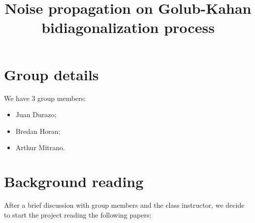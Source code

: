 \documentclass{article}
\begin{document}
\title{Noise propagation on Golub-Kahan bidiagonalization process}

\maketitle

\section{Group details}
We have 3 group members:
\begin{itemize}
	\item Juan Durazo; \\
	\item Bredan Horan; \\
	\item Arthur Mitrano.
\end{itemize}

\section{Background reading}
After a brief discussion with group members and the class instructor, we decide to start the project reading the following papers:

\end{document}
